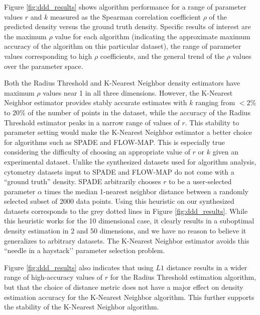 \documentclass{article}
\begin{document}
Figure \ref{fig:ddd_results} shows algorithm performance for a range of parameter values $r$ and $k$ measured as the Spearman correlation coefficient $\rho$ of the predicted density versus the ground truth density.   Specific results of interest are the maximum $\rho$ value for each algorithm (indicating the approximate maximum accuracy of the algorithm on this particular dataset), the range of parameter values corresponding to high $\rho$ coefficients, and the general trend of the $\rho$ values over the parameter space. 

Both the  Radius Threshold and K-Nearest Neighbor density estimators have maximum $\rho$ values near 1 in all three dimensions. However, the K-Nearest Neighbor estimator provides stably accurate estimates with $k$ ranging from $<2\%$ to $20\%$ of the number of points in the dataset, while the accuracy of the Radius Threshold estimator peaks in a narrow range of values of $r$. 
This stability to parameter setting would make the K-Nearest Neighbor estimator a better choice for algorithms such as SPADE and FLOW-MAP.  This is especially true considering the difficulty of choosing an appropriate value of $r$ or $k$ given an experimental dataset.  Unlike the synthesized datasets used for algorithm analysis, cytometry datasets input to SPADE and FLOW-MAP do not come with a ``ground truth'' density.  SPADE arbitrarily chooses $r$ to be a user-selected parameter $\alpha$ times the median 1-nearest neighbor distance between a randomly selected subset of 2000 data points. Using this heuristic on our synthesized datasets corresponds to the grey dotted lines in Figure \ref{fig:ddd_results}.  While this heuristic works for the 10 dimensional case, it clearly results in a suboptimal density estimation in 2 and 50 dimensions, and we have no reason to believe it generalizes to arbitrary datasets. The K-Nearest Neighbor estimator avoids this ``needle in a haystack’’ parameter selection problem.

Figure \ref{fig:ddd_results} also indicates that using $L1$ distance results in a wider range of high-accuracy values of $r$ for the Radius Threshold estimation algorithm, but that the choice of distance metric does not have a major effect on density estimation accuracy for the K-Nearest Neighbor algorithm.  This further supports the stability of the K-Nearest Neighbor algorithm.  
\end{document}
